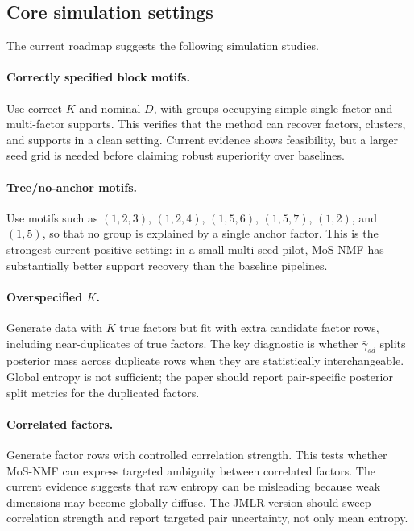 \documentclass[11pt]{article}
\theoremstyle{definition}
\begin{document}
\subsection{Core simulation settings}

The current roadmap suggests the following simulation studies.

\paragraph{Correctly specified block motifs.}
Use correct $K$ and nominal $D$, with groups occupying simple single-factor and
multi-factor supports. This verifies that the method can recover factors,
clusters, and supports in a clean setting. Current evidence shows feasibility,
but a larger seed grid is needed before claiming robust superiority over
baselines.

\paragraph{Tree/no-anchor motifs.}
Use motifs such as $(1,2,3)$, $(1,2,4)$, $(1,5,6)$, $(1,5,7)$, $(1,2)$, and
$(1,5)$, so that no group is explained by a single anchor factor. This is the
strongest current positive setting: in a small multi-seed pilot, MoS-NMF has
substantially better support recovery than the baseline pipelines.

\paragraph{Overspecified $K$.}
Generate data with $K$ true factors but fit with extra candidate factor rows,
including near-duplicates of true factors. The key diagnostic is whether
$\bar{\gamma}_{sd}$ splits posterior mass across duplicate rows when they are
statistically interchangeable. Global entropy is not sufficient; the paper
should report pair-specific posterior split metrics for the duplicated factors.

\paragraph{Correlated factors.}
Generate factor rows with controlled correlation strength. This tests whether
MoS-NMF can express targeted ambiguity between correlated factors. The current
evidence suggests that raw entropy can be misleading because weak dimensions may
become globally diffuse. The JMLR version should sweep correlation strength and
report targeted pair uncertainty, not only mean entropy.
\end{document}
